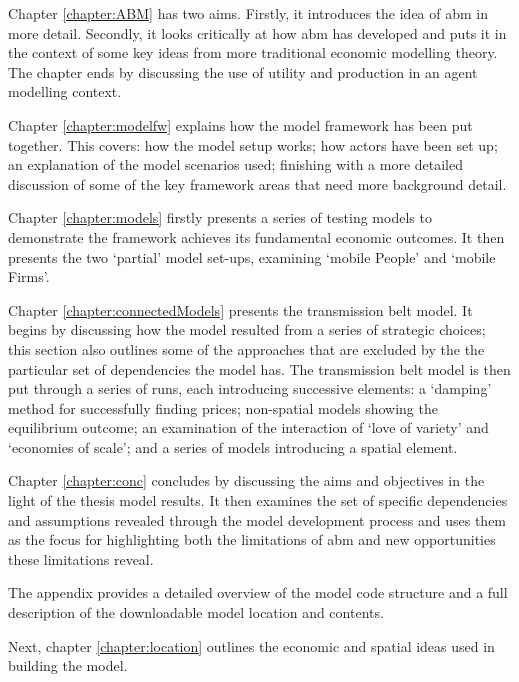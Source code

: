 Chapter \ref{chapter:ABM} has two aims. Firstly, it introduces the idea of \gls{abm} in more detail. Secondly, it looks critically at how \gls{abm} has developed and puts it in the context of some key ideas from more traditional economic modelling theory. The chapter ends by discussing the use of utility and production in an agent modelling context.

Chapter \ref{chapter:modelfw} explains how the model framework has been put together. This covers: how the model setup works; how actors have been set up; an explanation of the model scenarios used; finishing with a more detailed discussion of some of the key framework areas that need more background detail. 

Chapter \ref{chapter:models} firstly presents a series of testing models to demonstrate the framework achieves its fundamental economic outcomes. It then presents the two `partial' model set-ups, examining `mobile People' and `mobile Firms'.

Chapter \ref{chapter:connectedModels} presents the transmission belt model. It begins by discussing how the model resulted from a series of strategic choices; this section also outlines some of the approaches that are excluded by the the particular set of dependencies the model has. The transmission belt model is then put through a series of runs, each introducing successive elements: a `damping' method for successfully finding prices; non-spatial models showing the equilibrium outcome; an examination of the interaction of `love of variety' and `economies of scale'; and a series of models introducing a spatial element.

Chapter \ref{chapter:conc} concludes by discussing the aims and objectives in the light of the thesis model results. It then examines the set of specific dependencies and assumptions revealed through the model development process and uses them as the focus for highlighting both the limitations of \gls{abm} and new opportunities these limitations reveal.

The appendix provides a detailed overview of the model code structure and a full description of the downloadable model location and contents. 

Next, chapter \ref{chapter:location} outlines the economic and spatial ideas used in building the model. 

